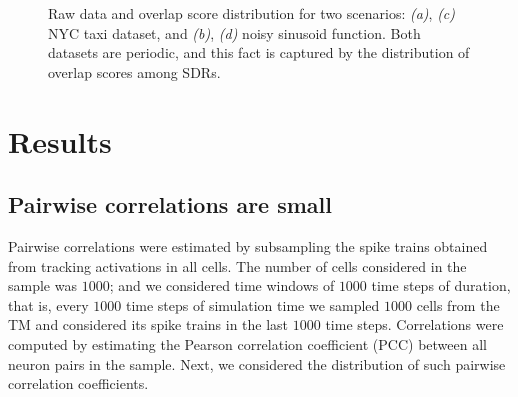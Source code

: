 \documentclass[11pt,letterpaper]{article}
\begin{document}
\begin{figure}[t]
{				\label{fig5:c}
			}
			\caption{
                Raw data and overlap score distribution for two scenarios:
                \emph{(a)}, \emph{(c)} NYC taxi dataset, and \emph{(b)}, \emph{(d)}
                noisy sinusoid function.
                Both datasets are periodic, and this fact is captured by the distribution
                of overlap scores among SDRs.
			}
			\label{fig5}
		\end{figure}  
		
		
    \section{Results}
        \subsection{Pairwise correlations are small}    
            Pairwise correlations were estimated by subsampling the spike trains obtained from tracking activations in all
            cells. The number of cells considered in the sample was $1000$; and we considered time windows of $1000$ time
            steps of duration, that is, every $1000$ time steps of simulation time we sampled $1000$ cells from the TM and
            considered its spike trains in the last $1000$ time steps.
            Correlations were computed by estimating the Pearson correlation coefficient (PCC) between all neuron pairs in the
            sample. 
            Next, we considered the distribution of such pairwise correlation coefficients.
\end{document}
